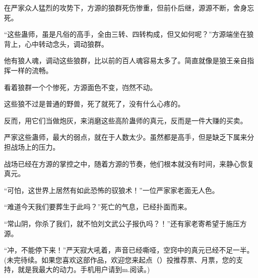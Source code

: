 \begin{this_body}
在严家众人猛烈的攻势下，方源的狼群死伤惨重，但前仆后继，源源不断，舍身忘死。

“这些蛊师，虽是凡俗的高手，全由三转、四转构成，但又如何呢？”方源端坐在狼背上，心中转动念头，调动狼群。

他有狼人魂，调动这些狼群，比以前的百人魂容易太多了。简直就像是狼王亲自指挥一样的流畅。

看着狼群一个个惨死，方源面色不变，岿然不动。

这些狼不过是普通的野兽，死了就死了，没有什么心疼的。

反而，用它们当做炮灰，来消磨这些高阶蛊师的真元，反而是一件大赚的买卖。

严家这些蛊师，最大的弱点，就在于人数太少。虽然都是高手，但是缺乏下属来分担战场上的压力。

战场已经在方源的掌控之中，随着方源的节奏，他们根本就没有时间，来静心恢复真元。

“可怕，这世界上居然有如此恐怖的驭狼术！”一位严家家老面无人色。

“难道今天我们要葬生于此吗？”死亡的气息，已经扑面而来。

“常山阴，你杀了我们，就不怕刘文武公子报仇吗？！”还有家老寄希望于施压方源。

“冲，不能停下来！”严天寂大吼着，声音已经嘶哑，空窍中的真元已经不足一半。(未完待续。如果您喜欢这部作品，欢迎您来起点（）投推荐票、月票，您的支持，就是我最大的动力。手机用户请到m.阅读。)

\end{this_body}

